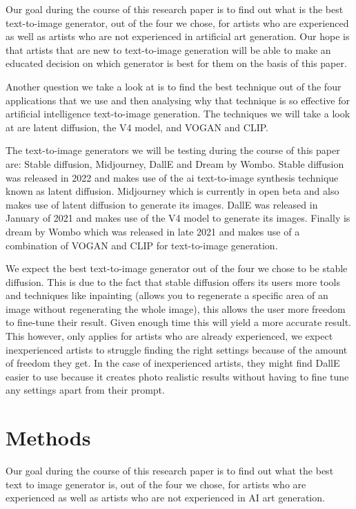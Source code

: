 \documentclass[]{report}
\begin{document}
Our goal during the course of this research paper is to find out what is the best text-to-image generator, out of the four we chose, for artists who are experienced as well as artists who are not experienced in artificial art generation. Our hope is that artists that are new to text-to-image generation will be able to make an educated decision on which generator is best for them on the basis of this paper.

Another question we take a look at is to find the best technique out of the four applications that we use and then analysing why that technique is so effective for artificial intelligence text-to-image generation. The techniques we will take a look at are latent diffusion, the V4 model, and VOGAN and CLIP.

The text-to-image generators we will be testing during the course of this paper are: Stable diffusion, Midjourney, DallE and Dream by Wombo. Stable diffusion was released in 2022 and makes use of the ai text-to-image synthesis technique known as latent diffusion. Midjourney which is currently in open beta and also makes use of latent diffusion to generate its images. DallE was released in January of 2021 and makes use of the V4 model to generate its images. Finally is dream by Wombo which was released in late 2021 and makes use of a combination of VOGAN and CLIP for text-to-image generation.

We expect the best text-to-image generator out of the four we chose to be stable diffusion. This is due to the fact that stable diffusion offers its users more tools and techniques like inpainting (allows you to regenerate a specific area of an image without regenerating the whole image), this allows the user more freedom to fine-tune their result. Given enough time this will yield a more accurate result. This however, only applies for artists who are already experienced, we expect inexperienced artists to struggle finding the right settings because of the amount of freedom they get. In the case of inexperienced artists, they might find DallE easier to use because it creates photo realistic results without having to fine tune any settings apart from their prompt.
	

	
	\section{Methods}
	
	Our goal during the course of this research paper is to find out what the best text to image generator is, out of the four we chose, for artists who are experienced as well as artists who are not experienced in AI art generation.
	
\end{document}
